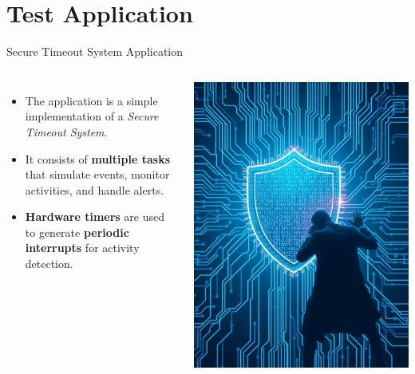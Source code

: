 
\section{Test Application}

\begin{frame}{Secure Timeout System Application}
    \begin{columns}
        \begin{itemize}
            \item The application is a simple implementation of a \textit{Secure Timeout System}.
            \item It consists of \textbf{multiple tasks} that simulate events, monitor activities, and handle alerts.
            \item \textbf{Hardware timers} are used to generate \textbf{periodic interrupts} for activity detection.
        \end{itemize}
        \centering
        \includegraphics[width=0.7\linewidth]{../images/app.png}
    \end{columns}
\end{frame}

